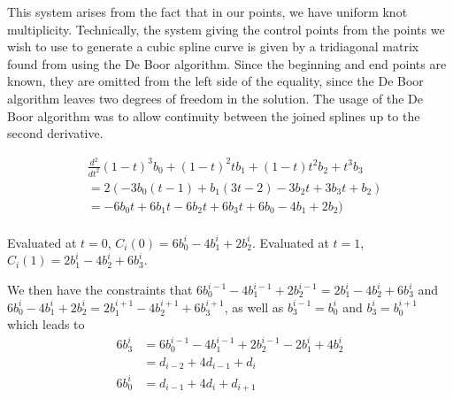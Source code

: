 \documentclass[12pt]{article}
\begin{document}
This system arises from the fact that in our points, we have uniform knot multiplicity. 
Technically, the system giving the control points from the points we wish to use to 
generate a cubic spline curve is given by a tridiagonal matrix found from using the 
De Boor algorithm. Since the beginning and end points are known, they are omitted from 
the left side of the equality, since the De Boor algorithm leaves two degrees of freedom in the solution.
The usage of the De Boor algorithm was to allow continuity between the joined splines up to the second derivative.

\begin{align*}
&\frac{d^2}{dt^2} (1-t)^3 b_0 + (1-t)^2 t b_1 + (1-t)t^2 b_2 + t^3 b_3\\
&= 2(-3 b_0(t-1) + b_1(3t - 2) - 3 b_2 t + 3 b_3 t + b_2)\\
&= -6 b_0 t + 6 b_1 t - 6 b_2 t + 6 b_3 t + 6 b_0 - 4 b_1 + 2 b_2)\\
\end{align*}

Evaluated at $t=0$,
$C_i(0) = 6 b_0^i - 4 b_1^i + 2 b_2^i$.
Evaluated at $t=1$,
$C_i(1) = 2 b_1^i - 4 b_2^i + 6 b_3^i$.

We then have the constraints that 
$6 b_0^{i-1} - 4 b_1^{i-1} + 2 b_2^{i-1} = 2 b_1^i - 4 b_2^i + 6 b_3^i$ and
$6 b_0^{i} - 4 b_1^{i} + 2 b_2^{i} = 2 b_1^{i+1} - 4 b_2^{i+1} + 6 b_3^{i+1}$,
as well as $b_3^{i-1} = b_0^i$ and $b_3^i = b_0^{i+1}$
which leads to 
\begin{align*}
6b_3^i &= 6 b_0 ^{i-1} - 4 b_1^{i-1} + 2b_2^{i-1}-2b_1^{i}+4b_2^i\\
&= d_{i-2} + 4 d_{i-1} + d_{i}\\
6b_0^i &= d_{i-1} + 4 d_{i} + d_{i+1}
\end{align*}
\end{document}
